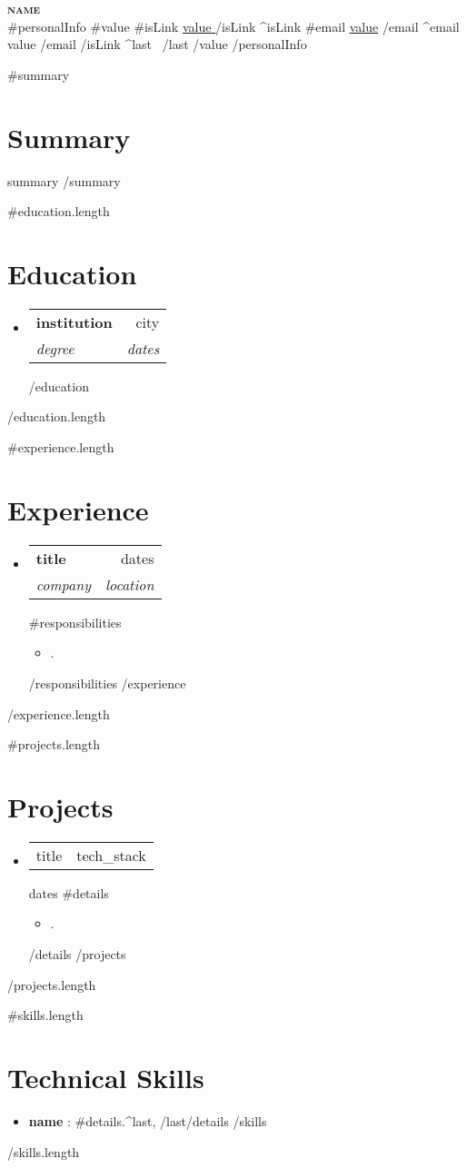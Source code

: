 \documentclass[letterpaper,11pt]{article}
\newcommand{\resumeItem}[1]{
  \item\small{
    {#1 \vspace{-2pt}}
  }
}
\newcommand{\resumeSubheading}[4]{
  \vspace{-2pt}\item
    \begin{tabularx}{\textwidth}{Xr}
      \textbf{#1} & #2 \\
      \textit{\small#3} & \textit{\small #4} \\
    \end{tabularx}\vspace{-7pt}
}
\newcommand{\resumeProjectHeading}[2]{
    \item
    \begin{tabularx}{\textwidth}{Xr}
      \small #1 & #2 \\
    \end{tabularx}\vspace{-7pt}
}
\newcommand{\resumeSubHeadingListStart}{\begin{itemize}[leftmargin=0.15in, label={}]}
\newcommand{\resumeSubHeadingListEnd}{\end{itemize}}
\newcommand{\resumeItemListStart}{\begin{itemize}}
\newcommand{\resumeItemListEnd}{\end{itemize}\vspace{-12pt}}
\begin{document}
\begin{center}
    \textbf{\Huge \scshape {{name}}} \\ \vspace{1pt}
    \small
    {{#personalInfo}}
      {{#value}}
        {{#isLink}}
          \href{ {{{link}}} }{ \underline{ {{value}} } }
        {{/isLink}}
        {{^isLink}}
          {{#email}}
            \underline{{{value}}}
          {{/email}}
          {{^email}}
            {{value}}
          {{/email}}
        {{/isLink}}
        {{^last}} \textbar\ {{/last}}
      {{/value}}
    {{/personalInfo}}
\end{center}

{{#summary}}
\section{Summary}
{{summary}}
{{/summary}}

{{#education.length}}
\section{Education}
  \resumeSubHeadingListStart
  {{#education}}
    \resumeSubheading
      {{institution}} { {{city}} }
      {{degree}} { {{dates}} }
  {{/education}}
  \resumeSubHeadingListEnd
{{/education.length}}

{{#experience.length}}
\section{Experience}
  \resumeSubHeadingListStart
  {{#experience}}
    \resumeSubheading
      {{title}} { {{dates}} }
      {{company}} { {{location}} }
      {{#responsibilities}}
      \resumeItemListStart
        \resumeItem{{.}}
      \resumeItemListEnd
      {{/responsibilities}}
  {{/experience}}
  \resumeSubHeadingListEnd
{{/experience.length}}

{{#projects.length}}
\section{Projects}
  \resumeSubHeadingListStart
  {{#projects}}
    \resumeProjectHeading
      {{title}} { {{tech_stack}} } { {{dates}} }
      {{#details}}
      \resumeItemListStart
        \resumeItem{{.}}
      \resumeItemListEnd
      {{/details}}
  {{/projects}}
  \resumeSubHeadingListEnd
{{/projects.length}}

{{#skills.length}}
\section{Technical Skills}
  \resumeSubHeadingListStart
  {{#skills}}
    \item \textbf{{name}} : {{#details}}{{.}}{{^last}}, {{/last}}{{/details}}
  {{/skills}}
  \resumeSubHeadingListEnd
{{/skills.length}}
\end{document}
